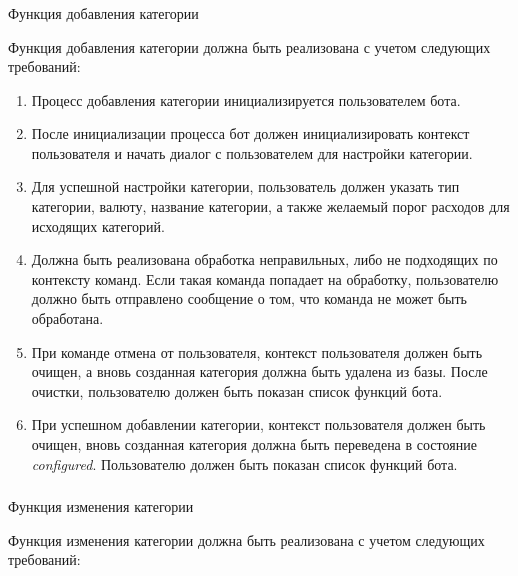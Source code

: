 \subsubsection{} Функция добавления категории
\label{sec:domain:specification:addcategory}

Функция добавления категории должна быть реализована с учетом следующих требований:

\begin{enumerate}
	\item Процесс добавления категории инициализируется пользователем бота.
	\item После инициализации процесса бот должен инициализировать контекст пользователя и начать диалог с пользователем для настройки категории.
	\item Для успешной настройки категории, пользователь должен указать тип категории, валюту, название категории, а также желаемый порог расходов для исходящих категорий.
	\item Должна быть реализована обработка неправильных, либо не подходящих по контексту команд. Если такая команда попадает на обработку, пользователю должно быть отправлено сообщение о том, что команда не может быть обработана.
	\item При команде отмена от пользователя, контекст пользователя должен быть очищен, а вновь созданная категория должна быть удалена из базы. После очистки, пользователю должен быть показан список функций бота.
	\item При успешном добавлении категории, контекст пользователя должен быть очищен, вновь созданная категория должна быть переведена в состояние \emph{configured}. Пользователю должен быть показан список функций бота.
\end{enumerate}

\subsubsection{} Функция изменения категории
\label{sec:domain:specification:editcategory}

Функция изменения категории должна быть реализована с учетом следующих требований:

